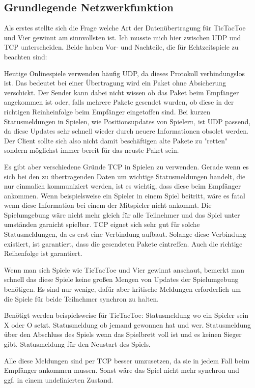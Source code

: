 \subsection{Grundlegende Netzwerkfunktion}
Als erstes stellte sich die Frage welche Art der Datenübertragung für TicTacToe und Vier gewinnt am sinnvollsten ist.
Ich musste mich hier zwischen UDP und TCP unterscheiden. Beide haben Vor- und Nachteile, die für Echtzeitspiele zu beachten sind:
\par
Heutige Onlinespiele verwenden häufig UDP, da dieses Protokoll verbindungslos ist.
Das bedeutet bei einer Übertragung wird ein Paket ohne Absicherung verschickt. Der Sender kann dabei nicht wissen ob das Paket
beim Empfänger angekommen ist oder, falls mehrere Pakete gesendet wurden, ob diese in der richtigen Reinheinfolge beim Empfänger
eingetoffen sind.
Bei kurzen Statusmeldungen in Spielen, wie Positionsupdates von Spielern, ist UDP passend, da diese Updates sehr schnell wieder
durch neuere Informationen obsolet werden. Der Client sollte sich also nicht damit beschäftigen alte Pakete zu "retten" sondern
möglichst immer bereit für das neuste Paket sein.
\par
Es gibt aber verschiedene Gründe TCP in Spielen zu verwenden.
Gerade wenn es sich bei den zu übertragenden Daten um wichtige Statusmeldungen handelt, die nur einmalich kommuniziert werden,
ist es wichtig, dass diese beim Empfänger ankommen. Wenn beispielsweise ein Spieler in einem Spiel beitritt, wäre es fatal
wenn diese Information bei einem der Mitspieler nicht ankommt. Die Spielumgebung wäre nicht mehr gleich für alle Teilnehmer
und das Spiel unter umständen garnicht spielbar. TCP eignet sich sehr gut für solche Statusmeldungen, da es erst eine Verbindung aufbaut.
Solange diese Verbindung existiert, ist garantiert, dass die gesendeten Pakete eintreffen. Auch die richtige Reihenfolge ist garantiert.
\par
Wenn man sich Spiele wie TicTacToe und Vier gewinnt anschaut, bemerkt man schnell das diese Spiele keine großen Mengen von Updates
der Spielumgebung benötigen. Es sind nur wenige, dafür aber kritische Meldungen erforderlich um die Spiele für beide Teilnehmer
synchron zu halten.
\par
Benötigt werden beispielsweise für TicTacToe:
\newline
Statusmeldung wo ein Spieler sein X oder O setzt.
\newline
Statusmeldung ob jemand gewonnen hat und wer.
\newline
Statusmeldung über den Abschluss des Spiels wenn das Spielbrett voll ist und es keinen Sieger gibt.
\newline
Statusmeldung für den Neustart des Spiels.
\par
Alle diese Meldungen sind per TCP besser umzusetzen, da sie in jedem Fall beim Empfänger ankommen mussen. Sonst wäre das Spiel
nicht mehr synchron und ggf. in einem undefinierten Zustand.
